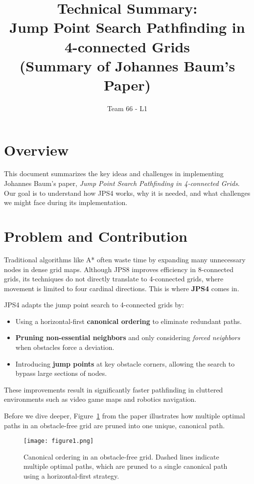 \documentclass[11pt]{article}
\title{Technical Summary:\\
\textbf{Jump Point Search Pathfinding in 4-connected Grids} \\
(Summary of Johannes Baum's Paper)}
\author{Team 66 - L1}
\date
\begin{document}
\maketitle
\thispagestyle{empty}

\section*{Overview}
This document summarizes the key ideas and challenges in implementing Johannes Baum’s paper, \textit{Jump Point Search Pathfinding in 4-connected Grids}. Our goal is to understand how JPS4 works, why it is needed, and what challenges we might face during its implementation.

\section{Problem and Contribution}
Traditional algorithms like A* often waste time by expanding many unnecessary nodes in dense grid maps. Although JPS8 improves efficiency in 8-connected grids, its techniques do not directly translate to 4-connected grids, where movement is limited to four cardinal directions. This is where \textbf{JPS4} comes in.

JPS4 adapts the jump point search to 4-connected grids by:
\begin{itemize}
    \item Using a horizontal-first \textbf{canonical ordering} to eliminate redundant paths.
    \item \textbf{Pruning non-essential neighbors} and only considering \emph{forced neighbors} when obstacles force a deviation.
    \item Introducing \textbf{jump points} at key obstacle corners, allowing the search to bypass large sections of nodes.
\end{itemize}
These improvements result in significantly faster pathfinding in cluttered environments such as video game maps and robotics navigation.

Before we dive deeper, Figure~\ref{fig:canonical} from the paper illustrates how multiple optimal paths in an obstacle-free grid are pruned into one unique, canonical path.

\begin{figure}[H]
    \centering
    \texttt{[image: figure1.png]}
    \caption{Canonical ordering in an obstacle-free grid. Dashed lines indicate multiple optimal paths, which are pruned to a single canonical path using a horizontal-first strategy.}
    \label{fig:canonical}
\end{figure}
\end{document}
